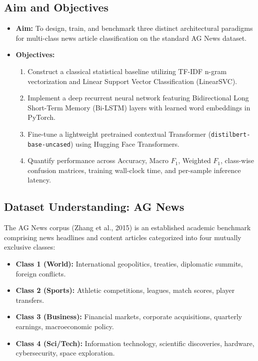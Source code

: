 \subsection{Aim and Objectives}
\begin{itemize}
    \item \textbf{Aim:} To design, train, and benchmark three distinct architectural paradigms for multi-class news article classification on the standard AG News dataset.
    \item \textbf{Objectives:}
    \begin{enumerate}
        \item Construct a classical statistical baseline utilizing TF-IDF n-gram vectorization and Linear Support Vector Classification (LinearSVC).
        \item Implement a deep recurrent neural network featuring Bidirectional Long Short-Term Memory (Bi-LSTM) layers with learned word embeddings in PyTorch.
        \item Fine-tune a lightweight pretrained contextual Transformer (\texttt{distilbert-base-uncased}) using Hugging Face Transformers.
        \item Quantify performance across Accuracy, Macro $F_1$, Weighted $F_1$, class-wise confusion matrices, training wall-clock time, and per-sample inference latency.
    \end{enumerate}
\end{itemize}

\subsection{Dataset Understanding: AG News}
The AG News corpus (Zhang et al., 2015) is an established academic benchmark comprising news headlines and content articles categorized into four mutually exclusive classes:
\begin{itemize}
    \item \textbf{Class 1 (World):} International geopolitics, treaties, diplomatic summits, foreign conflicts.
    \item \textbf{Class 2 (Sports):} Athletic competitions, leagues, match scores, player transfers.
    \item \textbf{Class 3 (Business):} Financial markets, corporate acquisitions, quarterly earnings, macroeconomic policy.
    \item \textbf{Class 4 (Sci/Tech):} Information technology, scientific discoveries, hardware, cybersecurity, space exploration.
\end{itemize}

